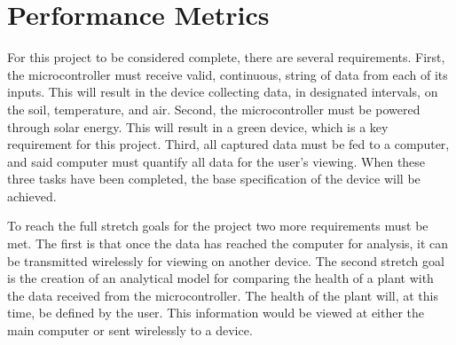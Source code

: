 \documentclass[IEEEtran,letterpaper,10pt,titlepage,fleqn,draftclsnofoot,onecolumn]{article}
\begin{document}
\section{Performance Metrics}

For this project to be considered complete, there are several requirements. First, the microcontroller must receive valid, continuous, string of data from each of its inputs. This will result in the device collecting data, in designated intervals, on the soil, temperature, and air. Second, the microcontroller must be powered through solar energy. This will result in a green device, which is a key requirement for this project. Third, all captured data must be fed to a computer, and said computer must quantify all data for the user’s viewing. When these three tasks have been completed, the base specification of the device will be achieved.

\vspace{5mm}

To reach the full stretch goals for the project two more requirements must be met. The first is that once the data has reached the computer for analysis, it can be transmitted wirelessly for viewing on another device. The second stretch goal is the creation of an analytical model for comparing the health of a plant with the data received from the microcontroller. The health of the plant will, at this time, be defined by the user. This information would be viewed at either the main computer or sent wirelessly to a device. 
\end{document}
